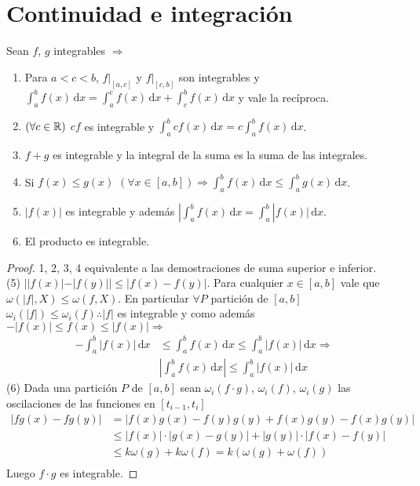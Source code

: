 \section{Continuidad e integración}
\begin{theorem}
  Sean \(f\), \(g\) integrables \(\Rightarrow \) \begin{enumerate}
    \item Para \(a < c < b\), \(f|_{[a, c]} \) y \(f|_{[c, b]} \) son integrables y \(\int_a^b f(x)\, \mathrm{d}x = \int_a^c f(x)\, \mathrm{d}x + \int_c^b f(x)\, \mathrm{d}x\) y vale la recíproca.
    \item \((\forall c \in \mathbb{R})\) \(c f\) es integrable y \(\int_a^b c f(x)\, \mathrm{d}x = c \int_a^b f(x)\, \mathrm{d}x\).
    \item \(f+g\) es integrable y la integral de la suma es la suma de las integrales.
    \item Si \(f(x) \leq g(x)\) \((\forall x \in [a, b]) \Rightarrow \int_a^b f(x) \, \mathrm{d}x \leq \int_a^b g(x) \, \mathrm{d}x\).
    \item \(|f(x)|\) es integrable y además \(|\int_a^b f(x) \, \mathrm{d}x = \int_a^b |f(x)| \, \mathrm{d}x\).
    \item El producto es integrable.
  \end{enumerate}
  \begin{proof}
    1, 2, 3, 4 equivalente a las demostraciones de suma superior e inferior. \\
    (5) \(| |f(x)| - |f(y)|| \leq |f(x) - f(y)|\). Para cualquier \(x \in [a, b]\) vale que \(\omega(|f|, X) \leq \omega(f, X)\). En particular \(\forall P\) partición de \([a, b]\) \(\omega_i(|f|) \leq \omega_i(f) \therefore |f|\) es integrable y como además \(-|f(x)| \leq f(x) \leq |f(x)| \Rightarrow \)
    \begin{align*}
      -\int_a^b |f(x)| \, \mathrm{d}x & \leq \int_a^b f(x) \, \mathrm{d}x \leq \int_a^b |f(x)| \, \mathrm{d}x \Rightarrow \\
                                      & \left| \int_a^b f(x) \, \mathrm{d}x \right| \leq \int_a^b |f(x)| \, \mathrm{d}x
    \end{align*}
    (6) Dada una partición \(P\) de \([a, b]\) sean \(\omega_i(f \cdot g)\), \(\omega_i(f)\), \(\omega_i(g)\) las oscilaciones de las funciones en \([t_{i-1}, t_i]\)
    \begin{align*}
      |fg(x) - fg(y)| & = |f(x)g(x) - f(y)g(y) + f(x)g(y) - f(x)g(y)|               \\
                      & \leq |f(x)| \cdot |g(x)- g(y)| + |g(y)| \cdot |f(x) - f(y)| \\
                      & \leq k \omega(g) + k \omega(f) = k (\omega(g) + \omega(f))  \\
    \end{align*} Luego \(f \cdot g\) es integrable.
  \end{proof}
\end{theorem}

